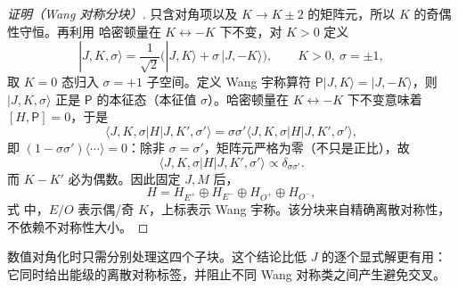 \begin{proof}[证明（Wang 对称分块）]
 只含对角项以及
\(K\to K\pm2\) 的矩阵元，所以 \(K\) 的奇偶性守恒。再利用
哈密顿量在 \(K\leftrightarrow-K\) 下不变，对 \(K>0\) 定义
\begin{equation}
|J,K,\sigma\rangle=\frac{1}{\sqrt2}\bigl(|J,K\rangle+\sigma\,|J,-K\rangle\bigr),
\qquad
K>0,\ \sigma=\pm1,
\label{eq:wang-transform}
\end{equation}
取 \(K=0\) 态归入 \(\sigma=+1\) 子空间。定义 Wang 宇称算符 \(\mathsf P|J,K\rangle=|J,-K\rangle\)，则 \(|J,K,\sigma\rangle\) 正是 \(\mathsf P\) 的本征态（本征值 \(\sigma\)）。哈密顿量在 \(K\leftrightarrow-K\) 下不变意味着 \([H,\mathsf P]=0\)，于是
\[
 \langle J,K,\sigma|H|J,K',\sigma'\rangle
 =\sigma\sigma'\langle J,K,\sigma|H|J,K',\sigma'\rangle,
\]
即 \((1-\sigma\sigma')\langle\cdots\rangle=0\)：除非 \(\sigma=\sigma'\)，矩阵元严格为零（不只是正比），故
\[
 \langle J,K,\sigma|H|J,K',\sigma'\rangle\propto\delta_{\sigma\sigma'}.
\]
而 \(K-K'\) 必为偶数。因此固定 \(J,M\) 后，
\begin{equation}
H=H_{E^+}\oplus H_{E^-}\oplus H_{O^+}\oplus H_{O^-},
\label{eq:wang-block-diagonalization}
\end{equation}
式  中，\(E/O\) 表示偶/奇 \(K\)，上标表示 Wang 宇称。该分块来自精确离散对称性，不依赖不对称性大小。
\end{proof}

数值对角化时只需分别处理这四个子块。这个结论比低 \(J\) 的逐个显式解更有用：它同时给出能级的离散对称标签，并阻止不同 Wang 对称类之间产生避免交叉。
